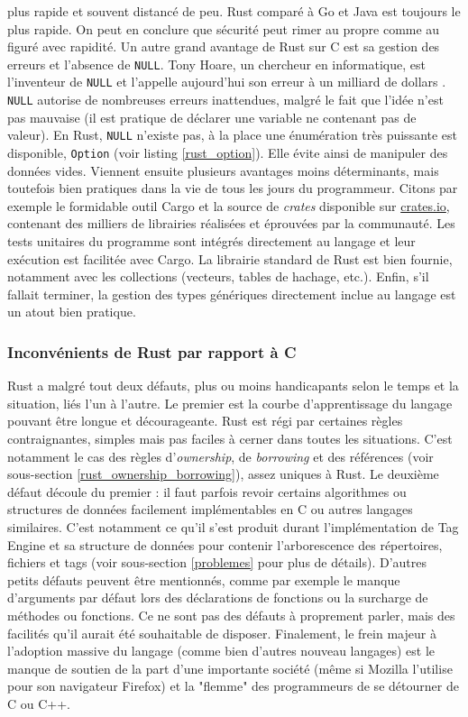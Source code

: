 plus rapide et souvent distancé de peu. Rust comparé à Go et Java est toujours le plus rapide. 
On peut en conclure que sécurité peut rimer au propre comme au figuré avec rapidité.
\bigbreak
Un autre grand avantage de Rust sur C est sa gestion des erreurs et l'absence de \texttt{NULL}. 
Tony Hoare, un chercheur en informatique, est l'inventeur de \texttt{NULL} et l'appelle 
aujourd'hui son erreur à un milliard de dollars \cite{ref52}. \texttt{NULL} autorise de 
nombreuses erreurs inattendues, malgré le fait que l'idée n'est pas mauvaise (il est pratique de 
déclarer une variable ne contenant pas de valeur). En Rust, \texttt{NULL} n'existe pas, à la 
place une énumération très puissante est disponible, \texttt{Option} (voir listing \ref{rust_option}).
Elle évite ainsi de manipuler des données vides.
\bigbreak
Viennent ensuite plusieurs avantages moins déterminants, mais toutefois bien pratiques dans la 
vie de tous les jours du programmeur. Citons par exemple le formidable outil Cargo et la source 
de \textit{crates} disponible sur \href{crates.io}{crates.io}, contenant des milliers de librairies 
réalisées et éprouvées par la communauté. Les tests unitaires du programme sont intégrés directement 
au langage et leur exécution est facilitée avec Cargo. La librairie standard de Rust est bien fournie,
notamment avec les collections (vecteurs, tables de hachage, etc.). Enfin, s'il fallait terminer, 
la gestion des types génériques directement inclue au langage est un atout bien pratique.

\subsubsection{Inconvénients de Rust par rapport à C}
Rust a malgré tout deux défauts, plus ou moins handicapants selon le temps et la situation, liés 
l'un à l'autre. Le premier est la courbe d'apprentissage du langage pouvant être longue et décourageante. 
Rust est régi par certaines règles contraignantes, simples mais pas faciles à cerner dans toutes 
les situations. C'est notamment le cas des règles d'\textit{ownership}, de \textit{borrowing} et 
des références (voir sous-section \ref{rust_ownership_borrowing}), assez uniques à Rust. 
Le deuxième défaut découle du premier : il faut parfois revoir certains algorithmes ou structures 
de données facilement implémentables en C ou autres langages similaires. C'est notamment ce qu'il 
s'est produit durant l'implémentation de Tag Engine et sa structure de données pour contenir 
l'arborescence des répertoires, fichiers et tags (voir sous-section \ref{problemes} pour plus de détails).
D'autres petits défauts peuvent être mentionnés, comme par exemple le manque d'arguments par défaut 
lors des déclarations de fonctions ou la surcharge de méthodes ou fonctions. Ce ne sont pas des 
défauts à proprement parler, mais des facilités qu'il aurait été souhaitable de disposer. 
Finalement, le frein majeur à l'adoption massive du langage (comme bien d'autres nouveau langages) 
est le manque de soutien de la part d'une importante société (même si Mozilla l'utilise pour 
son navigateur Firefox) et la "flemme" des programmeurs de se détourner de C ou C++.

